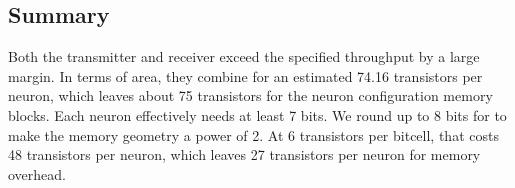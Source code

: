 \documentclass{article}
\begin{document}
\subsection{Summary}

Both the transmitter and receiver exceed the specified throughput by a large margin.
In terms of area, they combine for an estimated 74.16 transistors per neuron, 
which leaves about 75 transistors for the neuron configuration memory blocks.
Each neuron effectively needs at least 7 bits. We round up to 8 bits
for to make the memory geometry a power of 2. At 6 transistors per bitcell, that 
costs 48 transistors per neuron, which leaves 27 transistors per neuron
for memory overhead.

\end{document}
